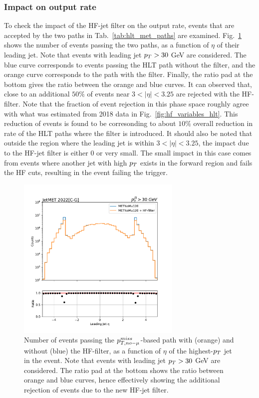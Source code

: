 \subsubsection{Impact on output rate}

To check the impact of the HF-jet filter on the output rate, events that are accepted by the two paths in Tab.~\ref{tab:hlt_met_paths} are examined. Fig.~\ref{fig:filterhf_rate}
shows the number of events passing the two paths, as a function of $\eta$ of their leading jet. Note that events with leading jet $p_T > 30$ GeV are considered. 
The blue curve corresponds to events passing the HLT path without the filter, and the orange curve corresponds to the path with the filter. Finally, the ratio pad at the bottom
gives the ratio between the orange and blue curves. It can observed that, close to an additional $50\%$ of events near $3<|\eta|<3.25$ are rejected with the HF-filter. Note that
the fraction of event rejection in this phase space roughly agree with what was estimated from 2018 data in Fig.~\ref{fig:hf_variables_hlt}. 
This reduction of events is found to be corresonding to about $10\%$ overall reduction in rate of the HLT paths where the filter is introduced. It should also be noted that
outside the region where the leading jet is within $3 < |\eta| < 3.25$, the impact due to the HF-jet filter is either $0$ or very small. The small impact in this case comes from
events where another jet with high $p_T$ exists in the forward region and fails the HF cuts, resulting in the event failing the trigger.

\begin{figure}[htbp]
    \centering
    \includegraphics[width=0.7\textwidth]{HFFilter/merged_2023-02-10_hlt_full_JetMET_2022_run/ak4_eta0_filterhf.pdf}    
    \caption{Number of events passing the $p_{T,no-\mu}^{miss}$-based path with (orange) and without (blue) the HF-filter, as a function of $\eta$ of the highest-$p_T$ jet in the event.
    Note that events with leading jet $p_T > 30$ GeV are considered. The ratio pad at the bottom shows the ratio between orange and blue curves, hence effectively showing the additional
    rejection of events due to the new HF-jet filter.}
    \label{fig:filterhf_rate}
\end{figure}

\clearpage